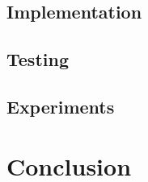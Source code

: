 \documentclass{article}
\begin{document}
    \subsection{Implementation}
        
    \subsection{Testing}
    \subsection{Experiments}

\newpage
\section{Conclusion}

\end{document}
